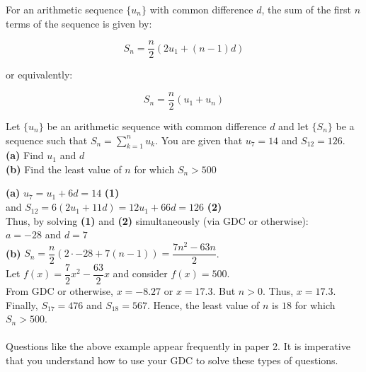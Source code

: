 \documentclass[12pt, a4paper, titlepage, twoside]{article}
\newcounter{excount}[subsection]
\begin{document}
	\begin{kp}
		For an arithmetic sequence $\{u_n\}$ with common difference $d$, the sum of the first $n$ terms of the sequence is given by:
		
		$$S_n = \dfrac{n}{2} \left(2u_1 + (n-1)d\right)$$
		
		or equivalently:
		
		$$S_n = \dfrac{n}{2} \left(u_1 + u_n\right)$$
	\end{kp}
	
	\hfill
	
	\begin{ex}
		Let $\{u_n\}$ be an arithmetic sequence with common difference $d$ and let $\{S_n\}$ be a sequence such that 
		$S_n = \displaystyle \sum_{k=1}^n u_k$. You are given that $u_7 = 14$ and $S_{12} = 126$.\\
		
		\textbf{(a)} Find $u_1$ and $d$\\
		\textbf{(b)} Find the least value of $n$ for which $S_n > 500$\\
		
		\tcbline
		\hfill
		
		\textbf{(a)} $u_7 = u_1 + 6d = 14$ \hfill \textbf{(1)}\\
		
		and $S_{12} = 6(2u_1 + 11d) = 12u_1 + 66d = 126$ \hfill \textbf{(2)}\\
		
		Thus, by solving \textbf{(1)} and \textbf{(2)} simultaneously (via GDC or otherwise): \\
		
		$a = -28$ and $d = 7$\\
		
		\textbf{(b)} $S_n = \dfrac{n}{2}(2 \cdot -28 + 7(n-1)) = \dfrac{7n^2 - 63n}{2}$.\\
		
		Let $f(x) = \dfrac{7}{2}x^2 - \dfrac{63}{2}x$ and consider $f(x) = 500$.\\
		
		From GDC or otherwise, $x = -8.27$ or $x = 17.3$. But $n>0$. Thus, $x = 17.3$.\\
		
		Finally, $S_{17} = 476$ and $S_{18} = 567$. Hence, the least value of $n$ is $18$ for which $S_n > 500$.
	\end{ex}	
	
	\paragraph{}
	Questions like the above example appear frequently in paper 2. It is imperative that you
	understand how to use your GDC to solve these types of questions. 
	
\end{document}
